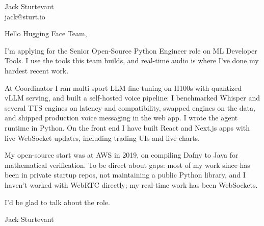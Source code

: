 \documentclass[11pt]{article}
\begin{document}
\raggedright

{\namefont\fontsize{20pt}{24pt}\selectfont Jack Sturtevant}\\[-0.3em]
jack@sturt.io

\vspace{1.2em}

Hello Hugging Face Team,

I'm applying for the Senior Open-Source Python Engineer role on ML Developer Tools. I use the tools this team builds, and real-time audio is where I've done my hardest recent work.

At Coordinator I ran multi-sport LLM fine-tuning on H100s with quantized vLLM serving, and built a self-hosted voice pipeline: I benchmarked Whisper and several TTS engines on latency and compatibility, swapped engines on the data, and shipped production voice messaging in the web app. I wrote the agent runtime in Python. On the front end I have built React and Next.js apps with live WebSocket updates, including trading UIs and live charts.

My open-source start was at AWS in 2019, on compiling Dafny to Java for mathematical verification. To be direct about gaps: most of my work since has been in private startup repos, not maintaining a public Python library, and I haven't worked with WebRTC directly; my real-time work has been WebSockets.

I'd be glad to talk about the role.

\vspace{0.6em}
Jack Sturtevant
\end{document}
